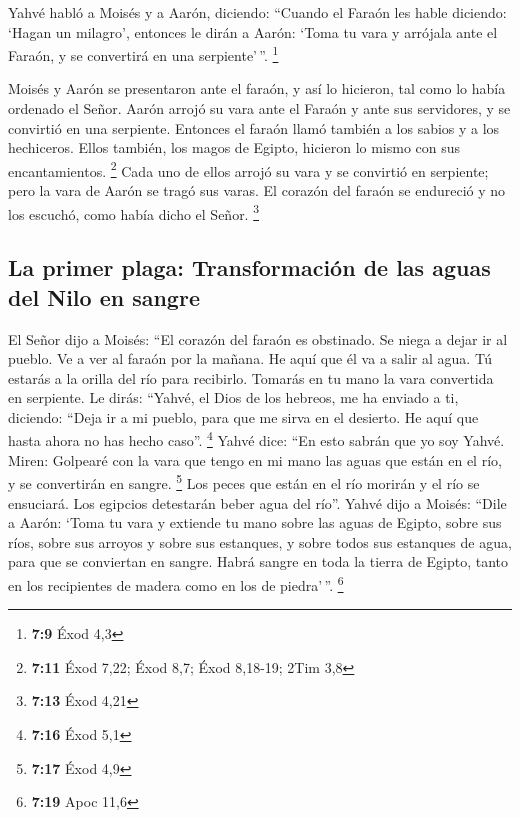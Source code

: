 \begin{paracol}{2}
 Yahvé habló a Moisés y a Aarón, diciendo: 
``Cuando el Faraón les hable diciendo: `Hagan un milagro', entonces le
dirán a Aarón: `Toma tu vara y arrójala ante el Faraón, y se convertirá
en una serpiente'\,''. \footnote{\textbf{7:9} Éxod 4,3}

 Moisés y Aarón se presentaron ante el faraón, y así lo
hicieron, tal como lo había ordenado el Señor. Aarón arrojó su vara ante
el Faraón y ante sus servidores, y se convirtió en una serpiente.
 Entonces el faraón llamó también a los sabios y a los
hechiceros. Ellos también, los magos de Egipto, hicieron lo mismo con
sus encantamientos. \footnote{\textbf{7:11} Éxod 7,22; Éxod 8,7; Éxod
  8,18-19; 2Tim 3,8}  Cada uno de ellos arrojó su vara y
se convirtió en serpiente; pero la vara de Aarón se tragó sus varas.
 El corazón del faraón se endureció y no los escuchó,
como había dicho el Señor. \footnote{\textbf{7:13} Éxod 4,21}

\hypertarget{la-primer-plaga-transformaciuxf3n-de-las-aguas-del-nilo-en-sangre}{%
\subsection{La primer plaga: Transformación de las aguas del Nilo en
sangre}\label{la-primer-plaga-transformaciuxf3n-de-las-aguas-del-nilo-en-sangre}}

 El Señor dijo a Moisés: ``El corazón del faraón es
obstinado. Se niega a dejar ir al pueblo.  Ve a ver al
faraón por la mañana. He aquí que él va a salir al agua. Tú estarás a la
orilla del río para recibirlo. Tomarás en tu mano la vara convertida en
serpiente.  Le dirás: ``Yahvé, el Dios de los hebreos, me
ha enviado a ti, diciendo: ``Deja ir a mi pueblo, para que me sirva en
el desierto. He aquí que hasta ahora no has hecho caso''. \footnote{\textbf{7:16}
  Éxod 5,1}  Yahvé dice: ``En esto sabrán que yo soy
Yahvé. Miren: Golpearé con la vara que tengo en mi mano las aguas que
están en el río, y se convertirán en sangre. \footnote{\textbf{7:17}
  Éxod 4,9}  Los peces que están en el río morirán y el
río se ensuciará. Los egipcios detestarán beber agua del río''.
 Yahvé dijo a Moisés: ``Dile a Aarón: `Toma tu vara y
extiende tu mano sobre las aguas de Egipto, sobre sus ríos, sobre sus
arroyos y sobre sus estanques, y sobre todos sus estanques de agua, para
que se conviertan en sangre. Habrá sangre en toda la tierra de Egipto,
tanto en los recipientes de madera como en los de piedra'\,''.
\footnote{\textbf{7:19} Apoc 11,6}


\end{paracol}
